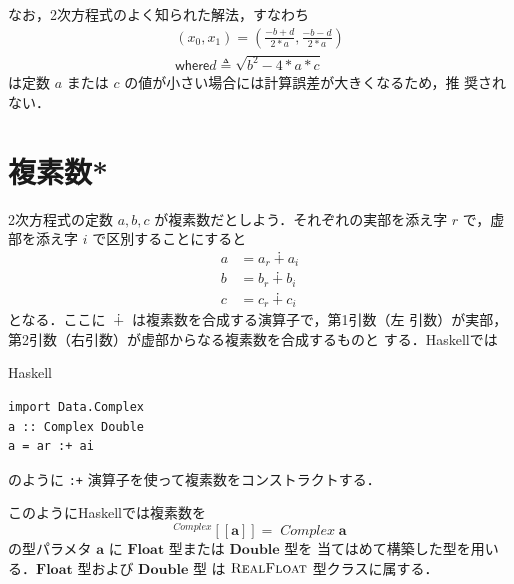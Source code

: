 \documentclass[a5paper,twoside,fleqn]{jsbook}
\def\[{\left[\!\left[}
\def\]{\right]\!\right]}
\newcommand{\programminglanguage}[1]{\textsf{#1}}
\newcommand{\haskell}{\programminglanguage{Haskell}}
\newcommand{\code}[1]{\texttt{#1}}
\newenvironment{haskellcode}{\begin{itembox}[r]{\haskell}}{\end{itembox}}
\newcommand{\mKeyword}[1]{\mathsf{#1}} %
\newcommand{\mWhereKeyword}{\mKeyword{where}}
\DeclareMathOperator{\mComplexPlus}{\dotplus}
\DeclareMathOperator{\mLetEq}{\triangleq}
\newcommand{\mType}[1]{\mathbf{#1}}
\newcommand{\mFloatType}{\mType{Float}}
\newcommand{\mDoubleType}{\mType{Double}}
\newcommand{\mGenericTypeAssemble}[2]{{}^{\mTypeConstructor{#1}}\[\mType{#2}\]}
\newcommand{\mComplexType}[1]{\mGenericTypeAssemble{Complex}{#1}}
\newcommand{\mTypeConstructor}[1]{\textit{#1}}
\newcommand{\mTupleWith}[1]{\left(#1\right)}
\newcommand{\mGenericTypeClass}[1]{\textsc{#1}} %
\newcommand{\mRealFloatTypeClass}{\mGenericTypeClass{RealFloat}}
\newcommand{\mWhereIs}[2]{\mathbin{\mWhereKeyword}#1\mLetEq#2}
\begin{document}
なお，2次方程式のよく知られた解法，すなわち
\begin{multline}
\mTupleWith{x_0,x_1}
=\mTupleWith{\frac{-b+d}{2*a},\frac{-b-d}{2*a}}\\
\mWhereIs{d}{\sqrt{b^2-4*a*c}}
\end{multline}
は定数 $a$ または $c$ の値が小さい場合には計算誤差が大きくなるため，推
奨されない．

\section{複素数*}

2次方程式の定数 $a,b,c$ が複素数だとしよう．それぞれの実部を添え字 $r$
で，虚部を添え字 $i$ で区別することにすると
\begin{align}
a&=a_r\mComplexPlus a_i\\
b&=b_r\mComplexPlus b_i\\
c&=c_r\mComplexPlus c_i
\end{align}
となる．ここに $\mComplexPlus$ は複素数を合成する演算子で，第1引数（左
  引数）が実部，第2引数（右引数）が虚部からなる複素数を合成するものと
する．\haskell では
\begin{haskellcode}
\begin{verbatim}
import Data.Complex
a :: Complex Double
a = ar :+ ai
\end{verbatim}
\end{haskellcode}
のように \code{:+} 演算子を使って複素数をコンストラクトする．

このように\haskell では複素数を
\begin{equation}
\mComplexType{a}=\mathop{\mTypeConstructor{Complex}}\mType{a}
\end{equation}
の型パラメタ $\mType{a}$ に $\mFloatType$ 型または $\mDoubleType$ 型を
当てはめて構築した型を用いる．$\mFloatType$ 型および $\mDoubleType$ 型
は $\mRealFloatTypeClass$ 型クラスに属する．
\end{document}
